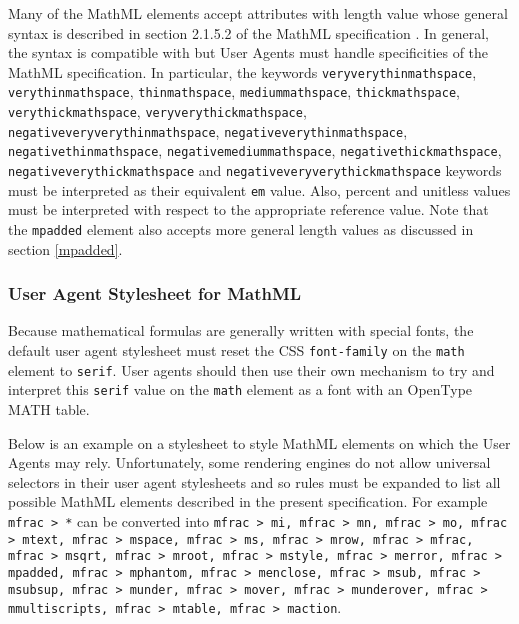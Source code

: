 Many of the MathML elements accept attributes with length value whose
general syntax is described in section 2.1.5.2 of the MathML specification
\cite{MathML3}. In general,
the syntax is compatible with \cite{CSS2} but User Agents must handle
specificities of the MathML specification. In particular, the keywords
{\tt veryverythinmathspace},
{\tt verythinmathspace},
{\tt thinmathspace},
{\tt mediummathspace},
{\tt thickmathspace},
{\tt verythickmathspace},
{\tt veryverythickmathspace},
{\tt negativeveryverythinmathspace},
{\tt negativeverythinmathspace},
{\tt negativethinmathspace},
{\tt negativemediummathspace},
{\tt negativethickmathspace},
{\tt negativeverythickmathspace} and
{\tt negativeveryverythickmathspace} keywords must be interpreted as their
equivalent {\tt em} value. Also, percent and unitless values must be interpreted
with respect to the appropriate reference value. Note that the {\tt mpadded}
element also accepts more general length values as discussed in section
\ref{mpadded}.

\subsubsection{User Agent Stylesheet for MathML}\label{UAStylesheet}

Because mathematical formulas are generally written with special fonts, the
default user agent stylesheet must reset the CSS {\tt font-family} on the
{\tt math} element to {\tt serif}. User agents should then use their own
mechanism to try and interpret this {\tt serif} value on the {\tt math} element
as a font with an OpenType MATH table.

Below is an example on a stylesheet to style MathML elements on which the
User Agents may rely. Unfortunately, some rendering engines do not allow
universal selectors in their user agent stylesheets and so rules must be
expanded to list all possible MathML elements described in the present
specification. For example {\tt mfrac > *} can be converted into
{\tt mfrac > mi, mfrac > mn, mfrac > mo, mfrac > mtext, mfrac > mspace,
mfrac > ms, mfrac > mrow, mfrac > mfrac, mfrac > msqrt, mfrac > mroot,
mfrac > mstyle, mfrac > merror, mfrac > mpadded, mfrac > mphantom,
mfrac > menclose, mfrac > msub, mfrac > msubsup, mfrac > munder, mfrac > mover,
mfrac > munderover, mfrac > mmultiscripts, mfrac > mtable, mfrac > maction}.

